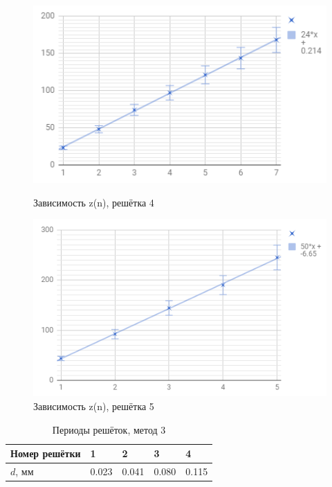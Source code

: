 \documentclass[a4paper]{article}
\begin{document}
\begin{enumerate}
\begin{figure}[h]
\begin{center}
\begin{minipage}[h]{0.45\linewidth}
\includegraphics[width=1\linewidth]{g4.PNG}
\caption{Зависимость z(n), решётка 4} %
\label{ris:experimoriginal} %
\end{minipage}
\hfill 
\begin{minipage}[h]{0.45\linewidth}
\includegraphics[width=1\linewidth]{g5.PNG}
\caption{Зависимость z(n), решётка 5}
\label{ris:experimcoded}
\end{minipage}
\end{center}
\end{figure}



    \begin{table}[h]
    \centering
    \begin{center}
    \caption{Периоды решёток, метод 3}
    \end{center}
    \vspace{0.1cm}
    \label{tab:my_label}
    \begin{tabular}{ |p{2.5cm}||p{0.7cm}|p{0.7cm}|p{0.7cm}|p{0.7cm}|}
 \hline
Номер решётки & 1 & 2 & 3 & 4\\
 \hline
 $d$, мм & 0.023 & 0.041 & 0.080 & 0.115\\


\end{tabular}
\end{table}
\end{enumerate}
\end{document}
